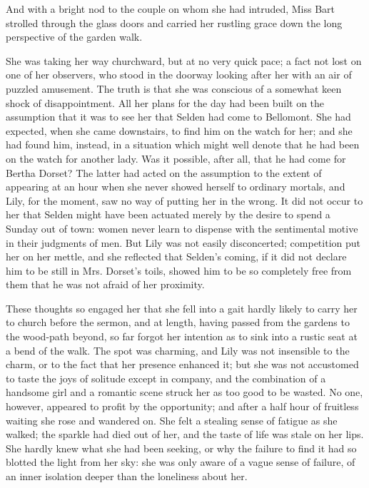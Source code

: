 \documentclass[12pt,a4paper]{book}
\begin{document}
And with a bright nod to the couple on whom she had intruded,
Miss Bart strolled through the glass doors and carried her
rustling grace down the long perspective of the garden walk.





She was taking her way churchward, but at no very quick pace; a
fact not lost on one of her observers, who stood in the doorway
looking after her with an air of puzzled amusement. The truth is
that she was conscious of a somewhat keen shock of
disappointment. All her plans for the day had been built on the
assumption that it was to see her that Selden had come to
Bellomont. She had expected, when she came downstairs, to
find him on the watch for her; and she had found him, instead, in
a situation which might well denote that he had been on the watch
for another lady. Was it possible, after all, that he had come
for Bertha Dorset? The latter had acted on the assumption to the
extent of appearing at an hour when she never showed herself to
ordinary mortals, and Lily, for the moment, saw no way of putting
her in the wrong. It did not occur to her that Selden might have
been actuated merely by the desire to spend a Sunday out of town: 
women never learn to dispense with the sentimental motive in
their judgments of men. But Lily was not easily disconcerted;
competition put her on her mettle, and she reflected that
Selden's coming, if it did not declare him to be still in Mrs.
Dorset's toils, showed him to be so completely free from them
that he was not afraid of her proximity.





These thoughts so engaged her that she fell into a gait hardly
likely to carry her to church before the sermon, and at length,
having passed from the gardens to the wood-path beyond, so far
forgot her intention as to sink into a rustic seat at a bend of
the walk. The spot was charming, and Lily was not insensible to
the charm, or to the fact that her presence enhanced it; but she
was not accustomed to taste the joys of solitude except in
company, and the combination of a handsome girl and a romantic
scene struck her as too good to be wasted. No one, however,
appeared to profit by the opportunity; and after a half hour of
fruitless waiting she rose and wandered on. She felt a stealing
sense of fatigue as she walked; the sparkle had died out of her,
and the taste of life was stale on her lips. She hardly knew what
she had been seeking, or why the failure to find it had so
blotted the light from her sky: she was only aware of a vague
sense of failure, of an inner isolation deeper than the
loneliness about her.
\end{document}

